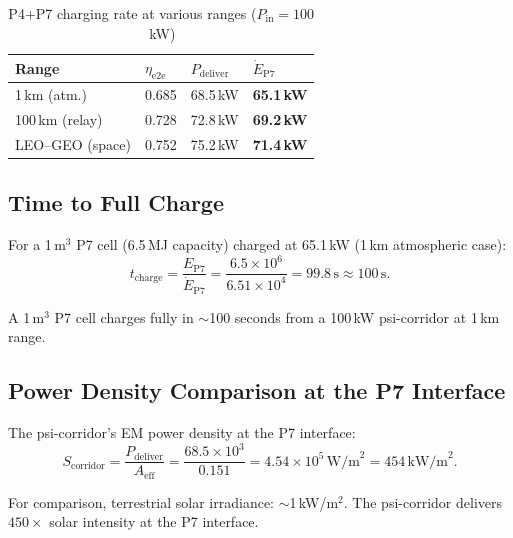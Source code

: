 \documentclass[aps,prd,twocolumn,superscriptaddress]{revtex4-2}
\begin{document}
\begin{table}[h]
\caption{P4+P7 charging rate at various ranges ($P_\mathrm{in} = 100$\,kW)}
\label{tab:charging}
\begin{ruledtabular}
\begin{tabular}{llll}
Range & $\eta_\mathrm{e2e}$ & $P_\mathrm{deliver}$ & $\dot{E}_\mathrm{P7}$ \\
\hline
1\,km (atm.) & 0.685 & 68.5\,kW & \textbf{65.1\,kW} \\
100\,km (relay) & 0.728 & 72.8\,kW & \textbf{69.2\,kW} \\
LEO--GEO (space) & 0.752 & 75.2\,kW & \textbf{71.4\,kW} \\
\end{tabular}
\end{ruledtabular}
\end{table}

\subsection{Time to Full Charge}

For a 1\,m$^3$ P7 cell (6.5\,MJ capacity) charged at 65.1\,kW
(1\,km atmospheric case):
\begin{equation}
t_\mathrm{charge} = \frac{E_\mathrm{P7}}{\dot{E}_\mathrm{P7}}
= \frac{6.5\times10^6}{6.51\times10^4} = 99.8\,\mathrm{s} \approx 100\,\mathrm{s}.
\label{eq:t_charge}
\end{equation}

A 1\,m$^3$ P7 cell charges fully in $\sim$100 seconds from a 100\,kW
psi-corridor at 1\,km range.

\subsection{Power Density Comparison at the P7 Interface}

The psi-corridor's EM power density at the P7 interface:
\begin{equation}
S_\mathrm{corridor} = \frac{P_\mathrm{deliver}}{A_\mathrm{eff}}
= \frac{68.5\times10^3}{0.151} = 4.54\times10^5\,\mathrm{W/m}^2 = 454\,\mathrm{kW/m}^2.
\label{eq:power_density}
\end{equation}

For comparison, terrestrial solar irradiance: $\sim$1\,kW/m$^2$.
The psi-corridor delivers $450\times$ solar intensity at the P7 interface.
\end{document}
